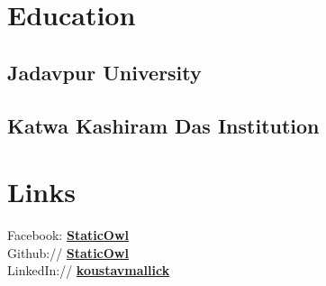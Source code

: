 \documentclass[]{css}
\begin{document}
%
%
\lastupdated

%
%

%
%

\begin{minipage}[t]{0.33\textwidth} 


\section{Education} 


\subsection{Jadavpur University}
\sectionsep

\subsection{Katwa Kashiram Das \newline Institution}
\sectionsep


\section{Links} 
Facebook: \href{https://www.facebook.com/StaicOwlGamer/}{\bf StaticOwl} \\
Github:// \href{https://github.com/StaticOwl}{\bf StaticOwl} \\
LinkedIn://  \href{https://www.linkedin.com/in/staticowl/}{\bf koustavmallick}


\end{minipage}
\end{document}
